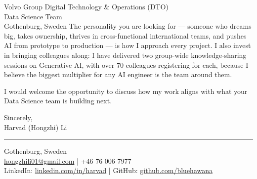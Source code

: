 \documentclass[a4paper,10pt]{article}
\begin{document}
\begin{letter}{
  \color{darkblue}
  Volvo Group Digital Technology \& Operations (DTO)\\
  Data Science Team\\
  Gothenburg, Sweden
}
The personality you are looking for --- someone who dreams big, takes ownership, thrives
in cross-functional international teams, and pushes AI from prototype to production ---
is how I approach every project. I also invest in bringing colleagues along: I have
delivered two group-wide knowledge-sharing sessions on Generative AI, with over 70
colleagues registering for each, because I believe the biggest multiplier for any AI
engineer is the team around them.

I would welcome the opportunity to discuss how my work aligns with what your Data
Science team is building next.

\vspace{10pt}

\closing{Sincerely,\\\vspace{15pt}Harvad (Hongzhi) Li}

\vspace{20pt}
{\color{darkblue}\rule{\linewidth}{0.6pt}}
\vspace{4pt}

{\color{darkblue}
  Gothenburg, Sweden\\
  \href{mailto:hongzhili01@gmail.com}{hongzhili01@gmail.com} | +46 76 006 7977\\
  LinkedIn: \href{https://www.linkedin.com/in/harvad/}{linkedin.com/in/harvad} |
  GitHub: \href{https://github.com/bluehawana}{github.com/bluehawana}
}

\end{letter}
\end{document}
